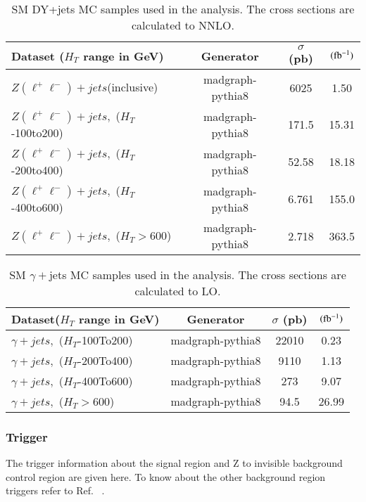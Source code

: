 \begin{table}[h]
\centering
\caption{SM DY+jets MC samples used in the analysis. The cross
  sections are calculated to NNLO. }
\label{tab:dyjetsMCsamples}
{\footnotesize
\begin{tabular}{lccc}
\hline \hline
Dataset ($H_{T}$ range in GeV) & Generator & $\sigma$ (pb) & $ (\rm fb^{-1})$ \\
\hline
$Z(\ell^{+} \ell^{-})+jets$(inclusive) & madgraph-pythia8 & 6025 & 1.50\\
$Z(\ell^{+} \ell^{-})+jets,$ ($ H_{T}$-100to200) & madgraph-pythia8 & 171.5 & 15.31\\
$Z(\ell^{+} \ell^{-})+jets,$ ($ H_{T}$-200to400) & madgraph-pythia8 & 52.58 & 18.18\\
$Z(\ell^{+} \ell^{-})+jets,$ ($ H_{T}$-400to600)  & madgraph-pythia8 & 6.761 & 155.0\\
$Z(\ell^{+} \ell^{-})+jets,$ ($ H_{T} > $600)  & madgraph-pythia8 & 2.718 & 363.5\\
\hline \hline
\end{tabular}
}
\end{table}

\begin{table}[h]
\centering
\caption{SM $\gamma+$jets MC samples used in the analysis. The cross
  sections are calculated to LO. }
\label{tab:gjetsMCsamples}
{\footnotesize
\begin{tabular}{lccc}
\hline \hline
Dataset($H_{T}$ range in GeV) & Generator & $\sigma$ (pb) & $ (\rm fb^{-1})$ \\
\hline
$\gamma +jets,$ ($ H_{T}$-100To200) & madgraph-pythia8 & 22010 & 0.23\\
$\gamma +jets,$ ($ H_{T}$-200To400) & madgraph-pythia8 & 9110 & 1.13\\
$\gamma +jets,$ ($ H_{T}$-400To600) & madgraph-pythia8 & 273 & 9.07\\
$\gamma +jets,$ ($ H_{T}>$600) & madgraph-pythia8 & 94.5 & 26.99\\
\hline \hline
\end{tabular}
}
\end{table}
\clearpage

\subsubsection{Trigger}

The trigger information about the signal region and Z to invisible background control region are given here. To know about the other background region triggers refer to Ref.~\cite{CMS-PAS-SUS-15-002} .

